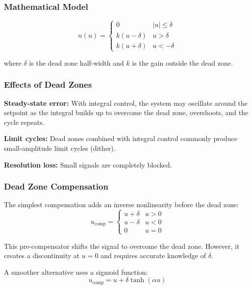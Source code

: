 \subsubsection{Mathematical Model}

\begin{equation}
n(u) = \begin{cases}
0 & |u| \leq \delta \\
k(u - \delta) & u > \delta \\
k(u + \delta) & u < -\delta
\end{cases}
\label{eq:dead_zone_model}
\end{equation}

where $\delta$ is the dead zone half-width and $k$ is the gain outside the dead zone.

\subsubsection{Effects of Dead Zones}

\textbf{Steady-state error:} With integral control, the system may oscillate around the setpoint as the integral builds up to overcome the dead zone, overshoots, and the cycle repeats.

\textbf{Limit cycles:} Dead zones combined with integral control commonly produce small-amplitude limit cycles (dither).

\textbf{Resolution loss:} Small signals are completely blocked.

\subsubsection{Dead Zone Compensation}

The simplest compensation adds an inverse nonlinearity before the dead zone:
\begin{equation}
u_{\text{comp}} = \begin{cases}
u + \delta & u > 0 \\
u - \delta & u < 0 \\
0 & u = 0
\end{cases}
\label{eq:dead_zone_comp}
\end{equation}

This pre-compensator shifts the signal to overcome the dead zone. However, it creates a discontinuity at $u = 0$ and requires accurate knowledge of $\delta$.

A smoother alternative uses a sigmoid function:
\begin{equation}
u_{\text{comp}} = u + \delta \tanh(\alpha u)
\end{equation}


